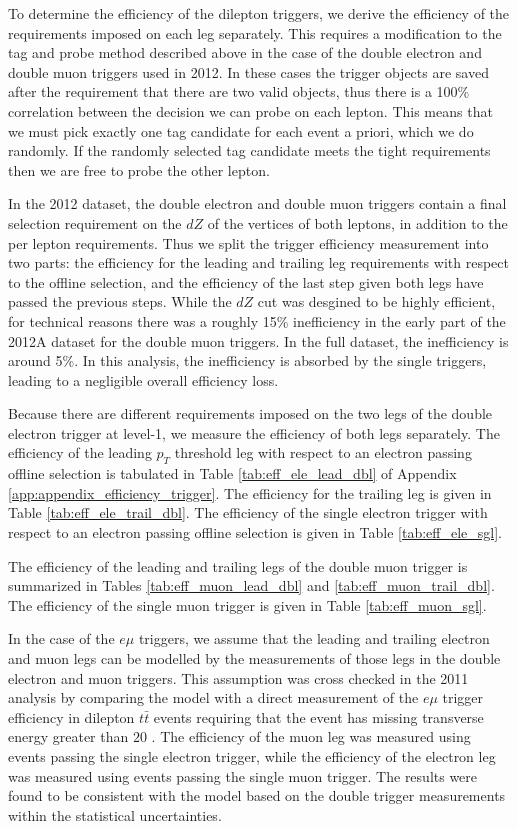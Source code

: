  
To determine the efficiency of the dilepton triggers, 
we derive the efficiency of the requirements imposed on each leg separately.
This requires a modification to the tag and probe method described above in 
the case of the double electron and double muon triggers used in 2012.
In these cases the trigger objects are saved after the requirement that there are two valid objects, 
thus there is a 100\% correlation between the decision we can probe on each lepton.
This means that we must pick exactly one tag candidate for each event a priori, which we do 
randomly. 
If the randomly selected tag candidate meets the tight requirements then we are free to 
probe the other lepton.

In the 2012 dataset, the double electron and double muon triggers contain 
a final selection requirement on the $dZ$ of the vertices of both leptons, 
in addition to the per lepton requirements.  Thus we split the trigger efficiency 
measurement into two parts: the efficiency for the leading and trailing leg 
requirements with respect to the offline selection, and the efficiency of the 
last step given both legs have passed the previous steps.
While the $dZ$ cut was desgined to be highly efficient,
for technical reasons there was a roughly 15\% inefficiency in
the early part of the 2012A dataset for the double muon triggers.
In the full dataset, the inefficiency is around 5\%.
In this analysis, the inefficiency is absorbed by the single triggers, 
leading to a negligible overall efficiency loss.

Because there are different requirements imposed on the two legs of the 
double electron trigger at level-1, we measure the efficiency of 
both legs separately.
The efficiency of the leading $p_T$ threshold leg with respect to an electron passing
offline selection is tabulated in 
Table \ref{tab:eff_ele_lead_dbl} of Appendix 
\ref{app:appendix_efficiency_trigger}. The efficiency for the trailing 
leg is given in Table \ref{tab:eff_ele_trail_dbl}. 
The efficiency of the single electron trigger with respect to
an electron passing offline selection is given in Table \ref{tab:eff_ele_sgl}.

The efficiency of the leading and trailing legs of the double muon trigger
is summarized in Tables \ref{tab:eff_muon_lead_dbl} and
\ref{tab:eff_muon_trail_dbl}. The efficiency of the single
muon trigger is given in Table \ref{tab:eff_muon_sgl}.

In the case of the $e\mu$ triggers, we assume that the leading
and trailing electron and muon legs can be modelled by the measurements
of those legs in the double electron and muon triggers. This assumption was cross 
checked in the 2011 analysis by comparing the model with
a direct measurement of the $e\mu$ trigger efficiency in
dilepton $t\bar{t}$ events requiring that the event has missing transverse
energy greater than $20$ \GeV.
The efficiency of 
the muon leg was measured using events passing the single electron trigger,
while the efficiency of the electron leg was measured using events passing the
single muon trigger. The results were found to be consistent
with the model based on the double trigger measurements within the 
statistical uncertainties. 

